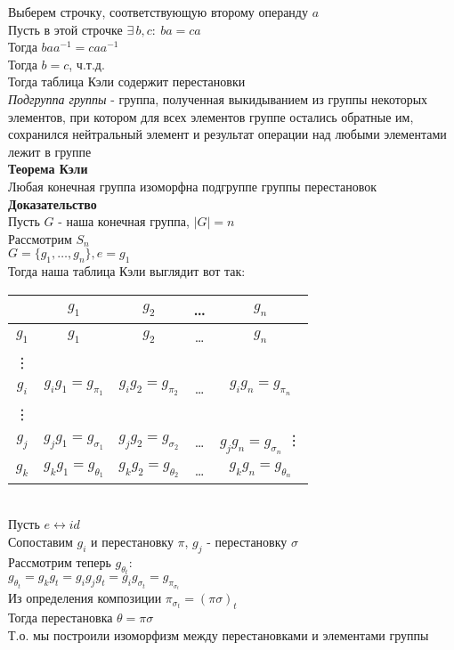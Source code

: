 \documentclass[12pt]{article}
\begin{document}
Выберем строчку, соответствующую второму операнду $a$\\
Пусть в этой строчке $\exists\,b,c:\ ba=ca$\\
Тогда $baa^{-1} = caa^{-1}$\\
Тогда $b = c$, ч.т.д.\\
Тогда таблица Кэли содержит перестановки\\
\textit{Подгруппа группы} - группа, полученная выкидыванием из группы некоторых элементов, при котором для всех элементов группе остались обратные им, сохранился нейтральный элемент и результат операции над любыми элементами лежит в группе\\
\textbf{Теорема Кэли}\\
Любая конечная группа изоморфна подгруппе группы перестановок\\
\textbf{Доказательство}\\
Пусть $G$ - наша конечная группа, $|G| = n$\\
Рассмотрим $S_n$\\
$G = \{g_1,\ldots,g_n\}, e = g_1$\\
Тогда наша таблица Кэли выглядит вот так:\\
\begin{tabular}{c|c c c c}
     & $g_1$ & $g_2$ & \ldots & $g_n$ \\
     \hline
     $g_1$ & $g_1$ & $g_2$ & \ldots & $g_n$\\
     \vdots\\
     $g_i$ & $g_ig_1 = g_{\pi_1}$ & $g_ig_2=g_{\pi_2}$ & \ldots & $g_ig_n = g_{\pi_n}$ \\
     \vdots\\
     $g_j$ & $g_jg_1 = g_{\sigma_1}$ & $g_jg_2=g_{\sigma_2}$ & \ldots & $g_jg_n = g_{\sigma_n}$ 
     \vdots\\
     $g_k$ & $g_kg_1 = g_{\theta_1}$ & $g_kg_2=g_{\theta_2}$ & \ldots & $g_kg_n = g_{\theta_n}$ 
\end{tabular}\\
Пусть $e \leftrightarrow id$\\
Сопоставим $g_i$ и перестановку $\pi$, $g_j$ - перестановку $\sigma$\\
Рассмотрим теперь $g_{\theta_t}:$\\
$g_{\theta_t} = g_kg_t = g_ig_jg_t = g_ig_{\sigma_t} = g_{\pi_{\sigma_t}}$\\
Из определения композиции $\pi_{\sigma_t} = (\pi\sigma)_t$\\
Тогда перестановка $\theta = \pi\sigma$\\
Т.о. мы построили изоморфизм между перестановками и элементами группы
\end{document}

